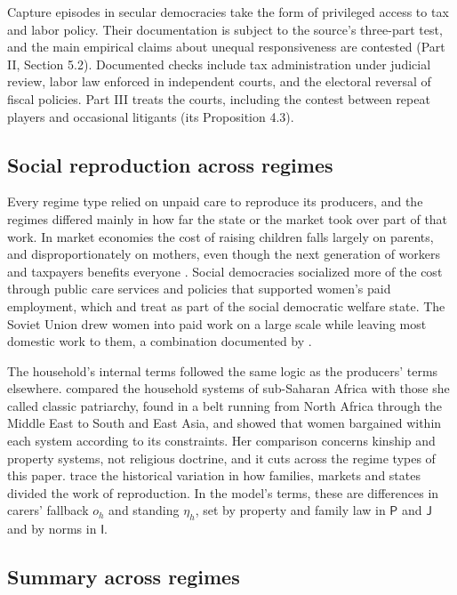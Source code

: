 \documentclass[11pt,letterpaper]{article}
\theoremstyle{definition}
\theoremstyle{remark}
\newcommand{\pP}{\mathsf{P}}
\newcommand{\pJ}{\mathsf{J}}
\newcommand{\pI}{\mathsf{I}}
\begin{document}
Capture episodes in secular democracies take the form of privileged access to tax and labor policy. Their documentation is subject to the source's three-part test, and the main empirical claims about unequal responsiveness are contested (Part II, Section 5.2). Documented checks include tax administration under judicial review, labor law enforced in independent courts, and the electoral reversal of fiscal policies. Part III treats the courts, including the contest between repeat players and occasional litigants (its Proposition 4.3).

\subsection{Social reproduction across regimes}

Every regime type relied on unpaid care to reproduce its producers, and the regimes differed mainly in how far the state or the market took over part of that work. In market economies the cost of raising children falls largely on parents, and disproportionately on mothers, even though the next generation of workers and taxpayers benefits everyone \citep{folbre1994}. Social democracies socialized more of the cost through public care services and policies that supported women's paid employment, which \citet{esping1990} and \citet{huber2001} treat as part of the social democratic welfare state. The Soviet Union drew women into paid work on a large scale while leaving most domestic work to them, a combination documented by \citet{lapidus1978}.

The household's internal terms followed the same logic as the producers' terms elsewhere. \citet{kandiyoti1988} compared the household systems of sub-Saharan Africa with those she called classic patriarchy, found in a belt running from North Africa through the Middle East to South and East Asia, and showed that women bargained within each system according to its constraints. Her comparison concerns kinship and property systems, not religious doctrine, and it cuts across the regime types of this paper. \citet{laslett1989} trace the historical variation in how families, markets and states divided the work of reproduction. In the model's terms, these are differences in carers' fallback $o_h$ and standing $\eta_h$, set by property and family law in $\pP$ and $\pJ$ and by norms in $\pI$.

\subsection{Summary across regimes}
\end{document}
